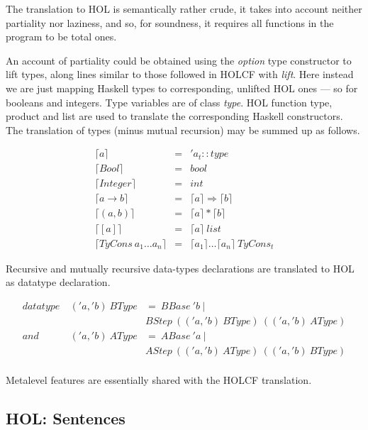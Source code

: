 \documentclass[a4paper,12pt]{article}
\begin{document}
The translation to HOL is semantically rather crude, it takes into
account neither partiality nor laziness, and so, for soundness, it
requires all functions in the program to be total ones.

An account of partiality could be obtained using the \emph{option}
type constructor to lift types, along lines similar to those followed
in HOLCF with \emph{lift}. Here instead we are just mapping Haskell
types to corresponding, unlifted HOL ones --- so for booleans and
integers. Type variables are of class \emph{type}.  HOL function type,
product and list are used to translate the corresponding Haskell
constructors. The translation of types (minus mutual recursion) may be
summed up as follows.


$$\begin{array}{lcl}
  \lceil a \rceil & = & 'a_{t}::type \\
  \lceil Bool \rceil & = & bool \\
  \lceil Integer \rceil & = & int \\
  \lceil a \to b \rceil & = & \lceil a \rceil \Rightarrow \lceil b \rceil \\
  \lceil (a,b) \rceil & = & \lceil a \rceil * \lceil b \rceil \\
  \lceil [a] \rceil & = & \lceil a \rceil \ list \\
  \lceil TyCons \ a_{1} \ldots a_{n} \rceil & = & \lceil a_{1} \rceil \ldots \lceil a_{n} \rceil \ TyCons_{t} 
\end{array}$$

\noindent Recursive and mutually recursive data-types declarations are
translated to HOL as datatype declaration.

$$\begin{array}{rll} datatype & \ ('a, 'b) \ BType & = \ BBase \ 'b \ | \\
  & & BStep \ (('a, 'b) \ BType) \ (('a, 'b) \ AType) \\
  and & \ ('a, 'b) \ AType & =  \ ABase \ 'a \ | \\
  & & AStep \ (('a, 'b) \ AType) \ (('a, 'b) \ BType) \\
\end{array}$$

\noindent Metalevel features are essentially shared with the HOLCF
translation.

\subsection{HOL: Sentences}
\end{document}
